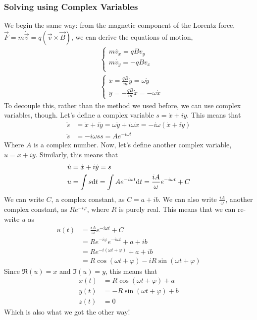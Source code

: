 \documentclass[a4paper]{article}
\begin{document}
\subsubsection{Solving using Complex Variables}
We begin the same way: from the magnetic component of the Lorentz force,
$\vec{F} = m\dot{\vec{v}} = q(\vec{v}\times\vec{B})$, we can derive the
equations of motion,
\begin{align*}
	&\begin{cases}
        m\dot{v_x}=qBv_y\\
        m\dot{v_y}=-qBv_x\\
    \end{cases}\\
    &\begin{cases}
        \ddot{x}=\frac{qB}{m}\dot{y}=\omega\dot{y}\\
        \ddot{y}=-\frac{qB}{m}\dot{x}=-\omega\dot{x}
    \end{cases}
\end{align*}
To decouple this, rather than the method we used before, we can use complex
variables, though. Let's define a complex variable $s=\dot{x}+i\dot{y}$. This
means that
\begin{align*}
	\ddot{s} &= \ddot{x}+i\ddot{y} = \omega\dot{y}+i\omega\dot{x}
		 = -i\omega(\dot{x}+i\dot{y})\\
	\ddot{s} &= -i\omega s
	s = Ae^{-i\omega t}
\end{align*}
Where $A$ is a complex number. Now, let's define another complex variable,
$u = x + iy$. Similarly, this means that
\begin{align*}
	\dot{u} &= \dot{x}+i\dot{y} = s\\
	u &= \int s\mathrm{d} t = \int Ae^{-i\omega t}\mathrm{d} t = \frac{iA}{\omega}e^{-i
	\omega t} + C
\end{align*}
We can write $C$, a complex constant, as $C = a + ib$. We can also write
$\frac{iA}{\omega}$, another complex constant, as $Re^{-i\varphi}$, where $R$
is purely real. This means that we can re-write $u$ as
\begin{align*}
	u(t) &= \frac{iA}{\omega}e^{-i\omega t} + C\\
	     &= Re^{-i\varphi}e^{-i\omega t}+a+ib\\
	     &= Re^{-i(\omega t+\varphi)}+a+ib\\
	     &= R\cos(\omega t+\varphi) - iR\sin(\omega t+\varphi)
\end{align*}
Since $\Re(u) = x$ and $\Im(u) = y$, this means that
\begin{align*}
	x(t) &= R\cos(\omega t + \varphi) + a\\
	y(t) &= -R\sin(\omega t + \varphi) + b\\
	z(t) &= 0
\end{align*}
Which is also what we got the other way!
\end{document}
